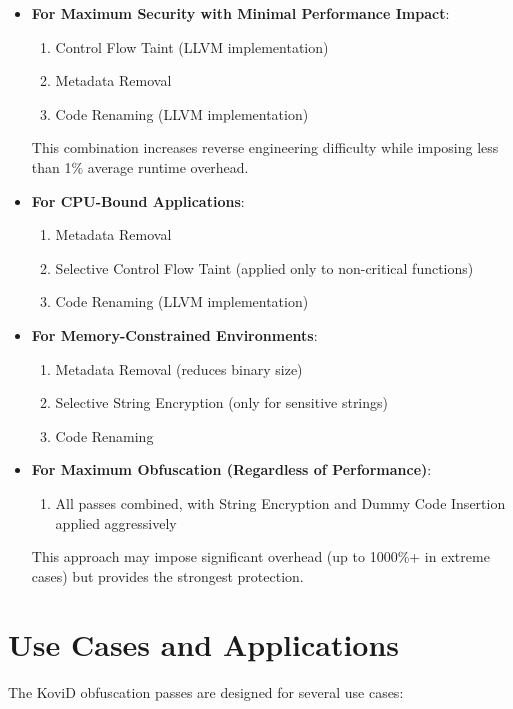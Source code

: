 \documentclass[conference]{IEEEtran}
\begin{document}
\begin{itemize}
    \item \textbf{For Maximum Security with Minimal Performance Impact}:
    \begin{enumerate}
        \item Control Flow Taint (LLVM implementation)
        \item Metadata Removal
        \item Code Renaming (LLVM implementation)
    \end{enumerate}
    This combination increases reverse engineering difficulty while imposing less than 1\% average runtime overhead.
    
    \item \textbf{For CPU-Bound Applications}:
    \begin{enumerate}
        \item Metadata Removal
        \item Selective Control Flow Taint (applied only to non-critical functions)
        \item Code Renaming (LLVM implementation)
    \end{enumerate}
    
    \item \textbf{For Memory-Constrained Environments}:
    \begin{enumerate}
        \item Metadata Removal (reduces binary size)
        \item Selective String Encryption (only for sensitive strings)
        \item Code Renaming
    \end{enumerate}
    
    \item \textbf{For Maximum Obfuscation (Regardless of Performance)}:
    \begin{enumerate}
        \item All passes combined, with String Encryption and Dummy Code Insertion applied aggressively
    \end{enumerate}
    This approach may impose significant overhead (up to 1000\%+ in extreme cases) but provides the strongest protection.
\end{itemize}

\section{Use Cases and Applications}
The KoviD obfuscation passes are designed for several use cases:
\end{document}
